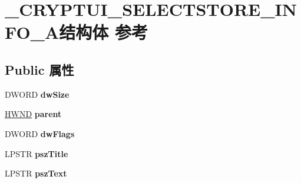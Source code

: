\hypertarget{struct___c_r_y_p_t_u_i___s_e_l_e_c_t_s_t_o_r_e___i_n_f_o___a}{}\section{\+\_\+\+C\+R\+Y\+P\+T\+U\+I\+\_\+\+S\+E\+L\+E\+C\+T\+S\+T\+O\+R\+E\+\_\+\+I\+N\+F\+O\+\_\+\+A结构体 参考}
\label{struct___c_r_y_p_t_u_i___s_e_l_e_c_t_s_t_o_r_e___i_n_f_o___a}
\subsection*{Public 属性}
\begin{DoxyCompactItemize}
\item 
\mbox{\label{struct___c_r_y_p_t_u_i___s_e_l_e_c_t_s_t_o_r_e___i_n_f_o___a_af997fa45c86a2812cab4ecbc70d3c7da}} 
D\+W\+O\+RD {\bfseries dw\+Size}
\item 
\mbox{\label{struct___c_r_y_p_t_u_i___s_e_l_e_c_t_s_t_o_r_e___i_n_f_o___a_a91bb0781780f9ab7e8cdfc3ddb55da2c}} 
\hyperlink{interfacevoid}{H\+W\+ND} {\bfseries parent}
\item 
\mbox{\label{struct___c_r_y_p_t_u_i___s_e_l_e_c_t_s_t_o_r_e___i_n_f_o___a_ab0ac0dde546b0e8eb8e34d208053b9b1}} 
D\+W\+O\+RD {\bfseries dw\+Flags}
\item 
\mbox{\label{struct___c_r_y_p_t_u_i___s_e_l_e_c_t_s_t_o_r_e___i_n_f_o___a_a93b64b3f436edff26cbef7965ac26273}} 
L\+P\+S\+TR {\bfseries psz\+Title}
\item 
\mbox{\label{struct___c_r_y_p_t_u_i___s_e_l_e_c_t_s_t_o_r_e___i_n_f_o___a_a6c6c4b5653a8d44879247dbf6f173a85}} 
L\+P\+S\+TR {\bfseries psz\+Text}
\item 
\mbox{\label{struct___c_r_y_p_t_u_i___s_e_l_e_c_t_s_t_o_r_e___i_n_f_o___a_a2e96be2eb8b11ad896b833c76ea40a74}} 

\end{DoxyCompactItemize}
